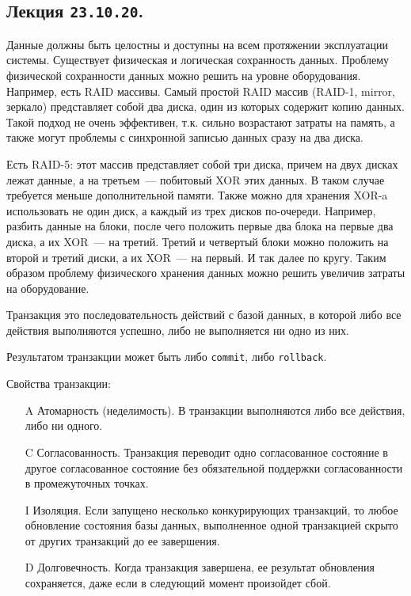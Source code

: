 \subsection{%
  Лекция \texttt{23.10.20}.%
}


Данные должны быть целостны и доступны на всем протяжении эксплуатации системы.
Существует физическая и логическая сохранность данных. Проблему физической
сохранности данных можно решить на уровне оборудования. Например, есть RAID
массивы. Самый простой RAID массив (RAID-1, mirror, зеркало) представляет собой
два диска, один из которых содержит копию данных. Такой подход не очень
эффективен, т.к. сильно возрастают затраты на память, а также могут проблемы с
синхронной записью данных сразу на два диска.

Есть RAID-5: этот массив представляет собой три диска, причем на двух
дисках лежат данные, а на третьем~--- побитовый XOR этих данных. В таком случае
требуется меньше дополнительной памяти. Также можно для хранения XOR-a
использовать не один диск, а каждый из трех дисков по-очереди. Например, разбить
данные на блоки, после чего положить первые два блока на первые два диска, а их
XOR~--- на третий. Третий и четвертый блоки можно положить на второй и третий
диски, а их XOR~--- на первый. И так далее по кругу. Таким образом проблему
физического хранения данных можно решить увеличив затраты на оборудование.

\begin{definition}
  Транзакция это последовательность действий с базой данных, в которой либо все
  действия выполняются успешно, либо не выполняется ни одно из них.

  Результатом транзакции может быть либо \texttt{commit}, либо
  \texttt{rollback}.
\end{definition}

Свойства транзакции:

\begin{enumerate}
\item[A]
  Атомарность (неделимость). В транзакции выполняются либо все действия, либо ни
  одного.

\item[C]
  Согласованность. Транзакция переводит одно согласованное состояние в другое
  согласованное состояние без обязательной поддержки согласованности в
  промежуточных точках.

\item[I]
  Изоляция. Если запущено несколько конкурирующих транзакций, то любое
  обновление состояния базы данных, выполненное одной транзакцией скрыто от
  других транзакций до ее завершения.

\item[D]
  Долговечность. Когда транзакция завершена, ее результат обновления
  сохраняется, даже если в следующий момент произойдет сбой.
\end{enumerate}

